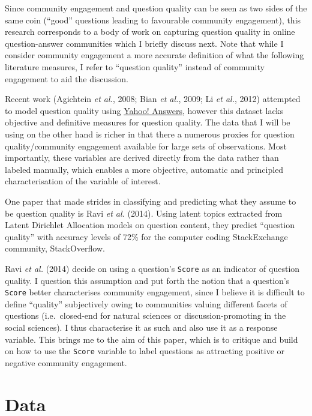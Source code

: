 \documentclass[11pt,preprint, authoryear]{article}
\numberwithin{equation}{section}
\numberwithin{figure}{section}
\numberwithin{table}{section}
\begin{document}
Since community engagement and question quality can be seen as two sides
of the same coin (``good'' questions leading to favourable community
engagement), this research corresponds to a body of work on capturing
question quality in online question-answer communities which I briefly
discuss next. Note that while I consider community engagement a more
accurate definition of what the following literature measures, I refer
to ``question quality'' instead of community engagement to aid the
discussion.

Recent work (Agichtein \emph{et al.}, 2008; Bian \emph{et al.}, 2009; Li
\emph{et al.}, 2012) attempted to model question quality using
\href{http://answers.yahoo.com}{Yahoo! Answers}, however this dataset
lacks objective and definitive measures for question quality. The data
that I will be using on the other hand is richer in that there a
numerous proxies for question quality/community engagement available for
large sets of observations. Most importantly, these variables are
derived directly from the data rather than labeled manually, which
enables a more objective, automatic and principled characterisation of
the variable of interest.

One paper that made strides in classifying and predicting what they
assume to be question quality is Ravi \emph{et al.} (2014). Using latent
topics extracted from Latent Dirichlet Allocation models on question
content, they predict ``question quality'' with accuracy levels of 72\%
for the computer coding StackExchange community, StackOverflow.

Ravi \emph{et al.} (2014) decide on using a question's \texttt{Score} as
an indicator of question quality. I question this assumption and put
forth the notion that a question's \texttt{Score} better characterises
community engagement, since I believe it is difficult to define
``quality'' subjectively owing to communities valuing different facets
of questions (i.e.~closed-end for natural sciences or
discussion-promoting in the social sciences). I thus characterise it as
such and also use it as a response variable. This brings me to the aim
of this paper, which is to critique and build on how to use the
\texttt{Score} variable to label questions as attracting positive or
negative community engagement.

\newpage

\section{\texorpdfstring{Data \label{Data}}{Data }}\label{data}
\end{document}
